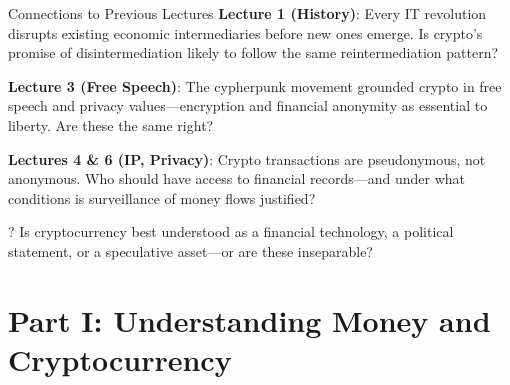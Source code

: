 ﻿\documentclass[aspectratio=169,11pt]{beamer}
\begin{document}
\begin{frame}{Connections to Previous Lectures}
\textbf{Lecture 1 (History)}: Every IT revolution disrupts existing economic intermediaries before new ones emerge. Is crypto's promise of disintermediation likely to follow the same reintermediation pattern?

\vspace{0.2cm}
\textbf{Lecture 3 (Free Speech)}: The cypherpunk movement grounded crypto in free speech and privacy values---encryption and financial anonymity as essential to liberty. Are these the same right?

\vspace{0.2cm}
\textbf{Lectures 4 \& 6 (IP, Privacy)}: Crypto transactions are pseudonymous, not anonymous. Who should have access to financial records---and under what conditions is surveillance of money flows justified?

\begin{alertblock}{?}
Is cryptocurrency best understood as a financial technology, a political statement, or a speculative asset---or are these inseparable?
\end{alertblock}
\end{frame}

\section{Part I: Understanding Money and Cryptocurrency}

\end{document}
